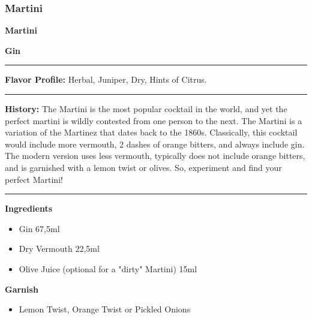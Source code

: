 \subsubsection{Martini}
\noindent
\begin{minipage}{.49\textwidth}
    \noindent\textbf{\LARGE Martini}
\end{minipage}
\hspace{.02\textwidth}
\begin{minipage}{.49\textwidth}
    \raggedleft
    \textbf{\large Gin}\\
\end{minipage}
\vspace{.5em}\hrule\vspace{.5em}
\noindent
\textbf{\large Flavor Profile:} Herbal, Juniper, Dry, Hints of Citrus.
\vspace{.5em}\hrule\vspace{.5em}
\noindent
\textbf{\large History:} The Martini is the most popular cocktail in the world, and yet the perfect martini is wildly contested from one person to the next. The Martini is a variation of the Martinez that dates back to the 1860s. Classically, this cocktail would include more vermouth, 2 dashes of orange bitters, and always include gin. The modern version uses less vermouth, typically does not include orange bitters, and is garnished with a lemon twist or olives. So, experiment and find your perfect Martini!
\vspace{.5em}\hrule\vspace{.5em}
\noindent
\begin{minipage}[t]{.49\textwidth}
    \noindent
    \textbf{\large Ingredients}
    \begin{itemize}
        \item Gin 67,5ml
        \item Dry Vermouth 22,5ml
        \item Olive Juice (optional for a "dirty" Martini) 15ml
    \end{itemize}
    \noindent
    \textbf{\large Garnish}
    \begin{itemize}
        \item Lemon Twist, Orange Twist or Pickled Onions
    \end{itemize}
\end{minipage}
